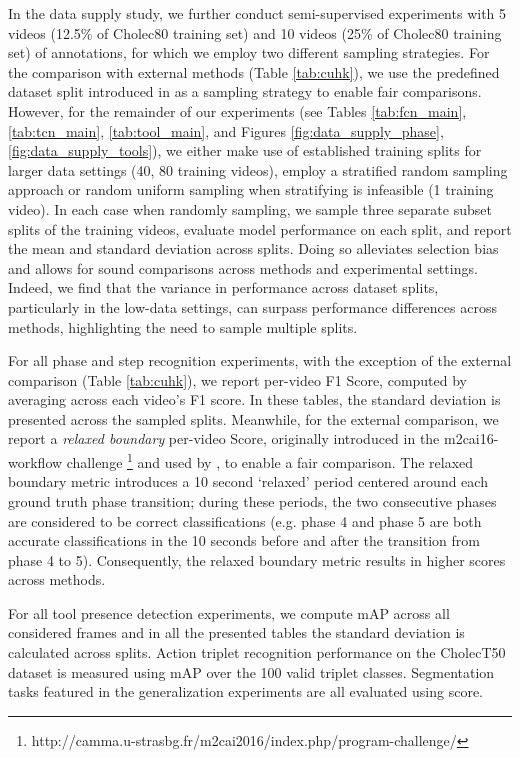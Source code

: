 \documentclass[times,twocolumn,final]{elsarticle}
\begin{document}
In the data supply study, we further conduct semi-supervised experiments with 5 videos (12.5\% of Cholec80 training set) and 10 videos (25\% of Cholec80 training set) of annotations, for which we employ two different sampling strategies. For the comparison with external methods (Table \ref{tab:cuhk}), we use the predefined dataset split introduced in \cite{shi_surgssl} as a sampling strategy to enable fair comparisons. However, for the remainder of our experiments (see Tables \ref{tab:fcn_main}, \ref{tab:tcn_main}, \ref{tab:tool_main}, and Figures \ref{fig:data_supply_phase}, \ref{fig:data_supply_tools}), we either make use of established training splits \citep{twinanda2016endonet} for larger data settings (40, 80 training videos), employ a stratified random sampling approach or random uniform sampling when stratifying is infeasible (1 training video). In each case when randomly sampling, we sample three separate subset splits of the training videos, evaluate model performance on each split, and report the mean and standard deviation across splits. Doing so alleviates selection bias and allows for sound comparisons across methods and experimental settings. Indeed, we find that the variance in performance across dataset splits, particularly in the low-data settings, can surpass performance differences across methods, highlighting the need to sample multiple splits.

For all phase {\color{changetext}and step} recognition experiments, with the exception of the external comparison (Table \ref{tab:cuhk}), we report per-video F1 Score, computed by averaging across each video's F1 score. In these tables, the standard deviation is presented across the sampled splits. Meanwhile, for the external comparison, we report a \textit{relaxed boundary} per-video  Score, originally introduced in the m2cai16-workflow challenge \footnote{http://camma.u-strasbg.fr/m2cai2016/index.php/program-challenge/} and used by \cite{shi_surgssl}, to enable a fair comparison. The relaxed boundary metric introduces a 10 second `relaxed' period centered around each ground truth phase transition; during these periods, the two consecutive phases are considered to be correct classifications (e.g. phase 4 and phase 5 are both accurate classifications in the 10 seconds before and after the transition from phase 4 to 5). Consequently, the relaxed boundary metric results in higher scores across methods.

For all tool presence detection experiments, we compute mAP across all considered frames and in all the presented tables the standard deviation is calculated across splits. {\color{newtext} Action triplet recognition performance on the CholecT50 dataset is measured using mAP over the 100 valid triplet classes. Segmentation tasks featured in the generalization experiments are all evaluated using  score.}
\end{document}
